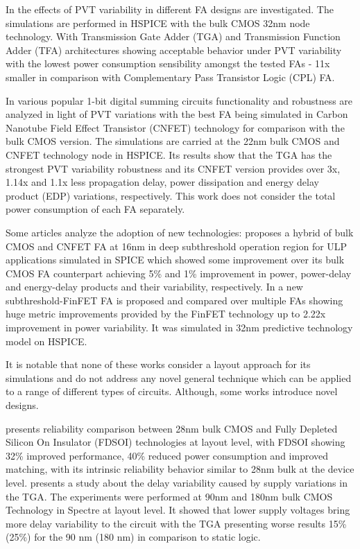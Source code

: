 \documentclass[pgmicro,mestrado,english]{iiufrgs}
\begin{document}
In \cite{ames2016investigating} the effects of PVT variability in different FA designs are investigated. The simulations are performed in HSPICE with the bulk CMOS 32nm node technology. With Transmission Gate Adder (TGA) and Transmission Function Adder (TFA) architectures showing acceptable behavior under PVT variability with the lowest power consumption sensibility amongst the tested FAs - 11x smaller in comparison with Complementary Pass Transistor Logic (CPL) FA.

In \cite{islam2011design} various popular 1-bit digital summing circuits functionality and robustness are analyzed in light of PVT variations with the best FA being simulated in Carbon Nanotube Field Effect Transistor (CNFET) technology for comparison with the bulk CMOS version. The simulations are carried at the 22nm bulk CMOS and CNFET technology node in HSPICE. Its results show that the TGA has the strongest PVT variability robustness and its CNFET version provides over 3x, 1.14x and 1.1x less propagation delay, power dissipation and energy delay product (EDP) variations, respectively. This work does not consider the total power consumption of each FA separately.

Some articles analyze the adoption of new technologies: \cite{guduri2015design} proposes a hybrid of bulk CMOS and CNFET FA at 16nm in deep subthreshold operation region for ULP applications simulated in SPICE which showed some improvement over its bulk CMOS FA counterpart achieving 5\% and 1\% improvement in power, power-delay and energy-delay products and their variability, respectively. In \cite{islam2011variability} a new subthreshold-FinFET FA is proposed and compared over multiple FAs showing huge metric improvements provided by the FinFET technology up to 2.22x improvement in power variability. It was simulated in 32nm predictive technology model on HSPICE.

It is notable that none of these works consider a layout approach for its simulations and do not address any novel general technique which can be applied to a range of different types of circuits. Although, some works introduce novel designs.

\cite{federspiel201228nm} presents reliability comparison between 28nm bulk CMOS and Fully Depleted Silicon On Insulator (FDSOI) technologies at layout level, with FDSOI showing 32\% improved performance, 40\% reduced power consumption and improved matching, with its intrinsic reliability behavior similar to 28nm bulk at the device level. \cite{alioto2007delay} presents a study about the delay variability caused by supply variations in the TGA. The experiments were performed at 90nm and 180nm bulk CMOS Technology in Spectre at layout level. It showed that lower supply voltages bring more delay variability to the circuit with the TGA presenting worse results 15\% (25\%) for the 90 nm (180 nm) in comparison to static logic.
\end{document}
